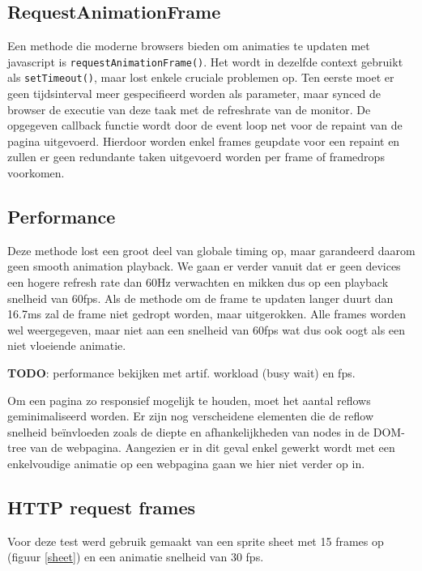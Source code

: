 \subsection{RequestAnimationFrame}

Een methode die moderne browsers bieden om animaties te updaten met javascript is \texttt{requestAnimationFrame()}. Het wordt in dezelfde context gebruikt als \texttt{setTimeout()}, maar lost enkele cruciale problemen op. Ten eerste moet er geen tijdsinterval meer gespecifieerd worden als parameter, maar synced de browser de executie van deze taak met de refreshrate van de monitor. De opgegeven callback functie wordt door de event loop net voor de repaint van de pagina uitgevoerd. Hierdoor worden enkel frames geupdate voor een repaint en zullen er geen redundante taken uitgevoerd worden per frame of framedrops voorkomen. \cite{requestFrameDocs}

\subsection{Performance} \label{performance}
Deze methode lost een groot deel van globale timing op, maar garandeerd daarom geen smooth animation playback. We gaan er verder vanuit dat er geen devices een hogere refresh rate dan 60Hz verwachten en mikken dus op een playback snelheid van 60fps. Als de methode om de frame te updaten langer duurt dan 16.7ms zal de frame niet gedropt worden, maar uitgerokken. Alle frames worden wel weergegeven, maar niet aan een snelheid van 60fps wat dus ook oogt als een niet vloeiende animatie.

\textbf{TODO}: performance bekijken met artif. workload (busy wait) en fps.

Om een pagina zo responsief mogelijk te houden, moet het aantal reflows geminimaliseerd worden. Er zijn nog verscheidene elementen die de reflow snelheid beïnvloeden zoals de diepte en afhankelijkheden van nodes in de DOM-tree van de webpagina. Aangezien er in dit geval enkel gewerkt wordt met een enkelvoudige animatie op een webpagina gaan we hier niet verder op in.
\cite{improvePerformance}


\subsection{HTTP request frames}

Voor deze test werd gebruik gemaakt van een sprite sheet met 15 frames op (figuur \ref{sheet}) en een animatie snelheid van 30 fps.

